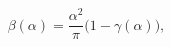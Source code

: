 \begin{equation}\label{NSVZ_Beta}
\beta(\alpha) = \frac{\alpha^2}{\pi}\Big(1-\gamma(\alpha)\Big),
\end{equation}

